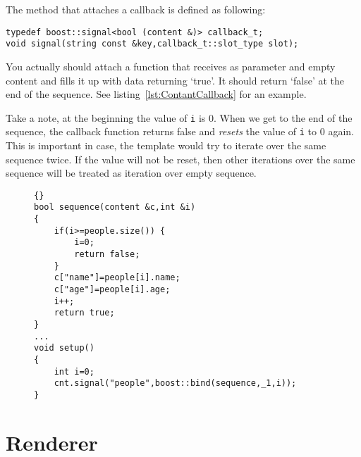 \documentclass{article}
\newcommand{\tw}[1]{\texttt{#1}}
\begin{document}
The method that attaches a callback is defined as following:

\begin{verbatim}
typedef boost::signal<bool (content &)> callback_t;
void signal(string const &key,callback_t::slot_type slot);
\end{verbatim}

You actually should attach a function that receives as parameter and empty content and fills it up with data returning `true'. It should return `false' at the end of the sequence. See listing~\ref{lst:ContantCallback} for an example.

Take a note, at the beginning the value of \tw{i} is 0. When we get to the end of the sequence, the callback function returns
false and \emph{resets} the value of \tw{i} to 0 again. This is important in case, the template would try to iterate
over the same sequence twice. If the value will not be reset, then other iterations over the same sequence will be
treated as iteration over empty sequence.

\begin{figure}
\begin{lstlisting}[label=lst:ContantCallback,caption=Creating a Sequence With Callback]{}
bool sequence(content &c,int &i)
{
	if(i>=people.size()) {
		i=0;
		return false;
	}
	c["name"]=people[i].name;
	c["age"]=people[i].age;
	i++;
	return true;
}
...
void setup()
{
	int i=0;
	cnt.signal("people",boost::bind(sequence,_1,i));
}
\end{lstlisting}

\end{figure}

\section{Renderer}
\end{document}
